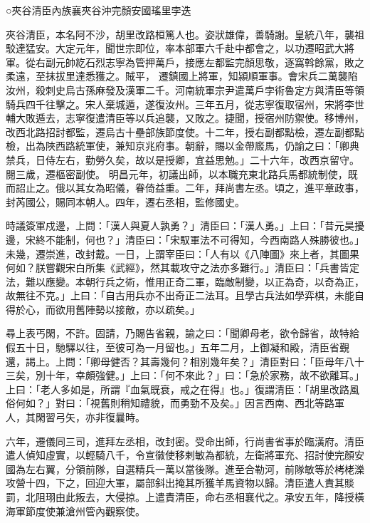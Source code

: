 
\begin{pinyinscope}

 ○夾谷清臣內族襄夾谷沖完顏安國瑤里孛迭



 夾谷清臣，本名阿不沙，胡里改路桓篤人也。姿狀雄偉，善騎謝。皇統八年，襲祖駮達猛安。大定元年，聞世宗即位，率本部軍六千赴中都會之，以功遷昭武大將軍。從右副元帥紇石烈志寧為管押萬戶，接應左都監完顏思敬，逐窩斡餘黨，敗之柔遠，至抹拔里達悉獲之。賊平，
 遷鎮國上將軍，知潁順軍事。會宋兵二萬襲陷汝州，殺刺史烏古孫麻發及漢軍二千。河南統軍宗尹遣萬戶孛術魯定方與清臣等領騎兵四千往擊之。宋人棄城遁，遂復汝州。三年五月，從志寧復取宿州，宋將李世輔大敗遁去，志寧復遣清臣等以兵追襲，又敗之。捷聞，授宿州防禦使。移博州，改西北路招討都監，遷烏古十壘部族節度使。十二年，授右副都點檢，遷左副都點檢，出為陜西路統軍使，兼知京兆府事。朝辭，賜以金帶廄馬，仍諭之曰：「卿典禁兵，日侍左右，勤勞久矣，故以是授卿，宜益思勉。」二十六年，改西京留守。閱三歲，遷樞密副使。
 明昌元年，初議出師，以本職充東北路兵馬都統制使，既而詔止之。俄以其女為昭儀，眷倚益重。二年，拜尚書左丞。頃之，進平章政事，封芮國公，賜同本朝人。四年，遷右丞相，監修國史。



 時議簽軍戍邊，上問：「漢人與夏人孰勇？」清臣曰：「漢人勇。」上曰：「昔元昊擾邊，宋終不能制，何也？」清臣曰：「宋馭軍法不可得知，今西南路人殊勝彼也。」未幾，遷崇進，改封戴。一日，上謂宰臣曰：「人有以《八陣圖》來上者，其圖果何如？朕嘗觀宋白所集《武經》，然其載攻守之法亦多難行。」清臣曰：「兵書皆定法，難以應變。本朝行兵之術，惟用正奇二軍，臨敵制變，以正為奇，以奇為正，
 故無往不克。」上曰：「自古用兵亦不出奇正二法耳。且學古兵法如學弈棋，未能自得於心，而欲用舊陣勢以接敵，亦以疏矣。」



 尋上表丐閑，不許。固請，乃賜告省親，諭之曰：「聞卿母老，欲令歸省，故特給假五十日，馳驛以往，至彼可為一月留也。」五年二月，上御凝和殿，清臣省覲還，謁上。上問：「卿母健否？其壽幾何？相別幾年矣？」清臣對曰：「臣母年八十三矣，別十年，幸頗強健。」上曰：「何不來此？」曰：「急於家務，故不欲離耳。」上曰：「老人多如是，所謂『血氣既衰，戒之在得』也。」復謂清臣：「胡里改路風俗何如？」對曰：「視舊則稍知禮貌，而勇勁不及矣。」因言西南、西北等路軍
 人，其閑習弓矢，亦非復曩時。



 六年，遷儀同三司，進拜左丞相，改封密。受命出師，行尚書省事於臨潢府。清臣遣人偵知虛實，以輕騎八千，令宣徽使移剌敏為都統，左衛將軍充、招討使完顏安國為左右翼，分領前隊，自選精兵一萬以當後隊。進至合勒河，前隊敏等於栲栳濼攻營十四，下之，回迎大軍，屬部斜出掩其所獲羊馬資物以歸。清臣遣人責其賧罰，北阻珝由此叛去，大侵掠。上遣責清臣，命右丞相襄代之。承安五年，降授橫海軍節度使兼滄州管內觀察使。




\end{pinyinscope}
